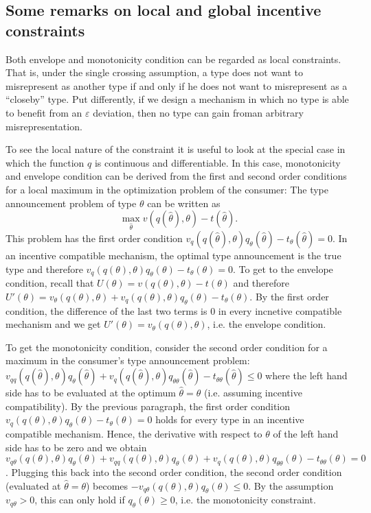 \documentclass[12pt]{article}
\begin{document}
\subsection{Some remarks on local and global incentive constraints}

Both envelope and monotonicity condition can be regarded as local constraints. That is, under the single crossing assumption, a type does not want to misrepresent as another type if and only if he does not want to misrepresent as a ``closeby'' type. Put differently, if we design a mechanism in which no type is able to benefit from an $\varepsilon $ deviation, then no type can gain froman arbitrary misrepresentation.

To see the local nature of the constraint it is useful to look at the special case in which the function $q$ is continuous and differentiable. In this case, monotonicity and envelope condition can be derived from the first and second order conditions for a local maximum in the optimization problem of the consumer:  The type announcement problem of type $\theta $ can be written as
\begin{equation*}
  \max_{\hat \theta }v(q(\hat{\theta }),\theta )-t(\hat{\theta }).
\end{equation*}
This problem has the first order condition $v_q(q(\hat\theta ),\theta )q_\theta (\hat \theta)-t_\theta (\hat{ \theta })=0$. In an incentive compatible mechanism, the optimal type announcement is the true type and therefore $v_q(q(\theta ),\theta )q_\theta ( \theta)-t_\theta ({ \theta })=0$. To get to the envelope condition, recall that $U(\theta )=v(q(\theta ),\theta )-t(\theta )$ and therefore $U'(\theta )=v_\theta (q(\theta ),\theta )+v_q(q(\theta ),\theta )q_\theta ( \theta)-t_\theta ({ \theta })$. By the first order condition, the difference of the last two terms is 0 in every incnetive compatible mechanism and we get $U'(\theta )=v_\theta (q(\theta ),\theta )$, i.e. the envelope condition.

To get the monotonicity condition, consider the second order condition for a maximum in the consumer's type announcement problem: $v_{qq}(q(\hat\theta ),\theta )q_\theta (\hat \theta)+v_{q}(q(\hat\theta ),\theta )q_{\theta \theta} (\hat \theta)-t_{\theta \theta} (\hat{ \theta })\leq0$ where the left hand side has to be evaluated at the optimum $\hat{\theta }=\theta $ (i.e. assuming incentive compatibility). By the previous paragraph, the first order condition $v_q(q(\theta ),\theta )q_\theta ( \theta)-t_\theta ({ \theta })=0$ holds for every type in an incentive compatible mechanism. Hence, the derivative with respect to $\theta $ of the left hand side has to be zero and we obtain $v_{q\theta }(q(\theta ),\theta )q_\theta (\theta )+v_{qq}(q(\theta ),\theta )q_\theta ( \theta)+v_{q}(q(\theta ),\theta )q_{\theta \theta} ( \theta)-t_{\theta \theta} ({ \theta })=0$. Plugging this back into the second order condition, the second order condition (evaluated at $\hat{\theta }=\theta $) becomes $-v_{q\theta }(q(\theta ),\theta )q_\theta (\theta )\leq 0$. By the assumption $v_{q\theta }>0$, this can only hold if $q_\theta (\theta )\geq 0$, i.e. the monotonicity constraint.
\end{document}
